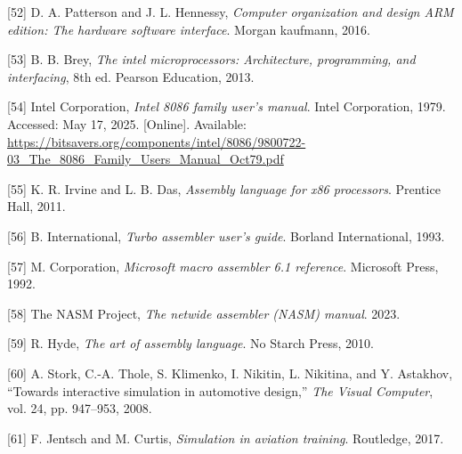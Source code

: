 \documentclass[12pt,oneside]{templates/unerthesis}
\newcommand{\CSLLeftMargin}[1]{#1} %
\newcommand{\CSLRightInline}[1]{#1} %
\newlength{\cslhangindent}
\newenvironment{CSLReferences}[2] %
 {\setlength{\parindent}{0pt}%
  \setlength{\leftskip}{#1 pt\relax}%
  \setlength{\parskip}{#2 pt\relax}%
  \everypar{\setlength{\hangindent}{\cslhangindent}}}
 {\par}
\begin{document}
\begin{CSLReferences}{0}{0}
\leavevmode{}%
\CSLLeftMargin{{[}52{]} }%
\CSLRightInline{D. A. Patterson and J. L. Hennessy, \emph{Computer organization and design ARM edition: The hardware software interface}. Morgan kaufmann, 2016.}

\leavevmode{}%
\CSLLeftMargin{{[}53{]} }%
\CSLRightInline{B. B. Brey, \emph{The intel microprocessors: Architecture, programming, and interfacing}, 8th ed. Pearson Education, 2013.}

\leavevmode{}%
\CSLLeftMargin{{[}54{]} }%
\CSLRightInline{Intel Corporation, \emph{Intel 8086 family user's manual}. Intel Corporation, 1979. Accessed: May 17, 2025. {[}Online{]}. Available: \url{https://bitsavers.org/components/intel/8086/9800722-03_The_8086_Family_Users_Manual_Oct79.pdf}}

\leavevmode{}%
\CSLLeftMargin{{[}55{]} }%
\CSLRightInline{K. R. Irvine and L. B. Das, \emph{Assembly language for x86 processors}. Prentice Hall, 2011.}

\leavevmode{}%
\CSLLeftMargin{{[}56{]} }%
\CSLRightInline{B. International, \emph{Turbo assembler user's guide}. Borland International, 1993.}

\leavevmode{}%
\CSLLeftMargin{{[}57{]} }%
\CSLRightInline{M. Corporation, \emph{Microsoft macro assembler 6.1 reference}. Microsoft Press, 1992.}

\leavevmode{}%
\CSLLeftMargin{{[}58{]} }%
\CSLRightInline{The NASM Project, \emph{The netwide assembler (NASM) manual}. 2023.}

\leavevmode{}%
\CSLLeftMargin{{[}59{]} }%
\CSLRightInline{R. Hyde, \emph{The art of assembly language}. No Starch Press, 2010.}

\leavevmode{}%
\CSLLeftMargin{{[}60{]} }%
\CSLRightInline{A. Stork, C.-A. Thole, S. Klimenko, I. Nikitin, L. Nikitina, and Y. Astakhov, {``Towards interactive simulation in automotive design,''} \emph{The Visual Computer}, vol. 24, pp. 947--953, 2008.}

\leavevmode{}%
\CSLLeftMargin{{[}61{]} }%
\CSLRightInline{F. Jentsch and M. Curtis, \emph{Simulation in aviation training}. Routledge, 2017.}


\end{CSLReferences}
\end{document}

